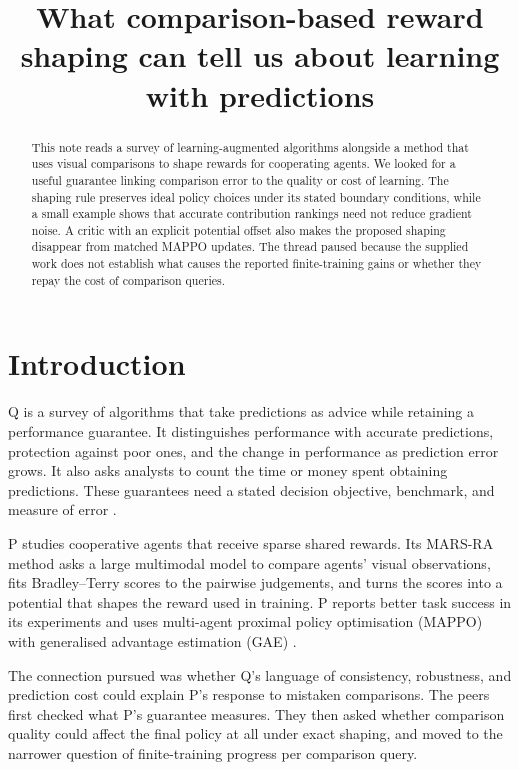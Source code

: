 \documentclass{article}
\title{What comparison-based reward shaping can tell us about learning with predictions}
\begin{document}
\maketitle

\begin{abstract}
This note reads a survey of learning-augmented algorithms alongside a method that uses visual comparisons to shape rewards for cooperating agents. We looked for a useful guarantee linking comparison error to the quality or cost of learning. The shaping rule preserves ideal policy choices under its stated boundary conditions, while a small example shows that accurate contribution rankings need not reduce gradient noise. A critic with an explicit potential offset also makes the proposed shaping disappear from matched MAPPO updates. The thread paused because the supplied work does not establish what causes the reported finite-training gains or whether they repay the cost of comparison queries.
\end{abstract}

\section{Introduction}

Q is a survey of algorithms that take predictions as advice while retaining a performance guarantee. It distinguishes performance with accurate predictions, protection against poor ones, and the change in performance as prediction error grows. It also asks analysts to count the time or money spent obtaining predictions. These guarantees need a stated decision objective, benchmark, and measure of error \cite{Q}.

P studies cooperative agents that receive sparse shared rewards. Its MARS-RA method asks a large multimodal model to compare agents' visual observations, fits Bradley--Terry scores to the pairwise judgements, and turns the scores into a potential that shapes the reward used in training. P reports better task success in its experiments and uses multi-agent proximal policy optimisation (MAPPO) with generalised advantage estimation (GAE) \cite{P}.

The connection pursued was whether Q's language of consistency, robustness, and prediction cost could explain P's response to mistaken comparisons. The peers first checked what P's guarantee measures. They then asked whether comparison quality could affect the final policy at all under exact shaping, and moved to the narrower question of finite-training progress per comparison query.
\end{document}
